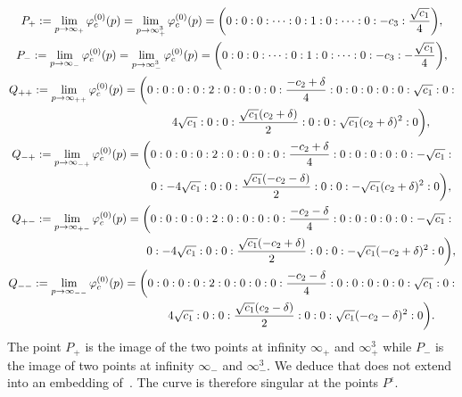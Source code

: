 \documentclass[pdftex]{sigma}
\numberwithin{equation}{section}
\begin{document}
\begin{gather*}
 P_+ := \lim \limits_{p\rightarrow \infty_{+}}\varphi_c^{(0)}(p)= \lim \limits_{p\rightarrow \infty^3_{+}}\varphi_c^{(0)}(p)= \biggl(0:0:0:\dots:0:1:0:\dots:0:-c_3:\frac{ \sqrt{c_1}}{4}\biggr),\\
 P_- := \lim \limits_{p\rightarrow \infty_{-}}\varphi_c^{(0)}(p)= \lim \limits_{p\rightarrow \infty^3_{-}}\varphi_c^{(0)}(p)= \biggl(0:0:0:\dots:0:1:0:\dots:0:-c_3:-\frac{
 \sqrt{c_1}}{4}\biggr),\\
 Q_{++} := \lim \limits_{p\rightarrow
 \infty_{++}}\varphi_c^{(0)}(p)
 = \biggl(0:0:0:0:2:0:0:0:0:\frac{-c_2+\delta}{4}:0:0:0:0:0: \sqrt{c_1}:0:\\ \hphantom{Q_{++}:=\lim \limits_{p\rightarrow\infty_{++}}\varphi_c^{(0)}(p)= \biggl(}{}
 4\sqrt{c_1}:0:0:\frac{\sqrt{c_1}(c_2+\delta)}{2}:0:0:\sqrt{c_1}(c_2+\delta)^2:0\biggr),\\
 Q_{-+} := \lim \limits_{p\rightarrow
 \infty_{-+}}\varphi_c^{(0)}(p)
 = \biggl(0:0:0:0:2:0:0:0:0:\frac{-c_2+\delta}{4}:0:0:0:0:0: -\sqrt{c_1}:\\ \hphantom{ Q_{-+}:= \lim \limits_{p\rightarrow\infty_{-+}}\varphi_c^{(0)}(p)= \biggl(}{}
 0:-4\sqrt{c_1}:0:0:\frac{\sqrt{c_1}(-c_2-\delta)}{2}:0:0:-\sqrt{c_1}(c_2+\delta)^2:0\biggr),\\
 Q_{+-} := \lim \limits_{p\rightarrow
 \infty_{+-}}\varphi_c^{(0)}(p)
 = \biggl(0:0:0:0:2:0:0:0:0:\frac{-c_2-\delta}{4}:0:0:0:0:0: -\sqrt{c_1}:\\ \hphantom{Q_{+-} := \lim \limits_{p\rightarrow\infty_{+-}}\varphi_c^{(0)}(p) = \biggl(}
 0:-4\sqrt{c_1}:0:0:\frac{\sqrt{c_1}(-c_2+\delta)}{2}:0:0:-\sqrt{c_1}(-c_2+\delta)^2:0\biggr),\\
Q_{--} := \lim \limits_{p\rightarrow
 \infty_{--}}\varphi_c^{(0)}(p)
 = \biggl(0:0:0:0:2:0:0:0:0:\frac{-c_2-\delta}{4}:0:0:0:0:0: \sqrt{c_1}:0:\\ \hphantom{Q_{--} := \lim \limits_{p\rightarrow\infty_{--}}\varphi_c^{(0)}(p)= \biggl(}{}
 4\sqrt{c_1}:0:0:\frac{\sqrt{c_1}(c_2-\delta)}{2}:0:0:\sqrt{c_1}(-c_2-\delta)^2:0\biggr).
\end{gather*}
The point $P_+$ is the image of the two points at infinity
$\infty_{+}$ and $\infty^3_{+}$ while $P_-$ is the image of two
points at infinity $\infty_{-}$ and $\infty^3_{-}$. We deduce that
 does not extend into an embedding of~. The curve
 is therefore singular at the points
$P^{\epsilon}$.
\end{document}
